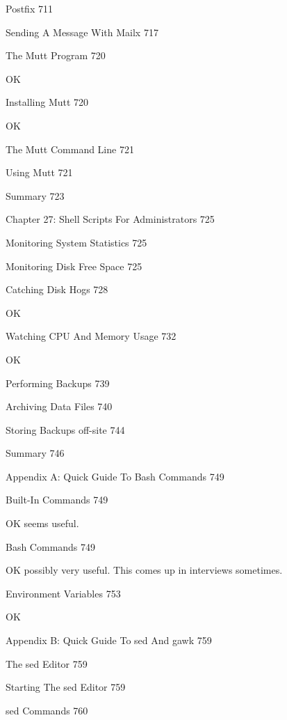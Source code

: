 Postfix 711



Sending A Message With Mailx 717



The Mutt Program 720

OK

Installing Mutt 720

OK

The Mutt Command Line 721



Using Mutt 721



Summary 723



Chapter 27: Shell Scripts For Administrators 725



Monitoring System Statistics 725



Monitoring Disk Free Space 725



Catching Disk Hogs 728

OK

Watching CPU And Memory Usage 732

OK

Performing Backups 739



Archiving Data Files 740



Storing Backups off-site 744



Summary 746



Appendix A: Quick Guide To Bash Commands 749



Built-In Commands 749

OK seems useful.

Bash Commands 749

OK possibly very useful. This comes up in interviews sometimes.

Environment Variables 753

OK

Appendix B: Quick Guide To sed And gawk 759



The sed Editor 759



Starting The sed Editor 759



sed Commands 760



